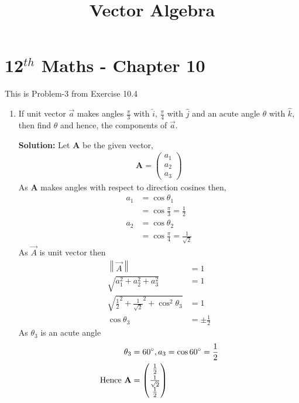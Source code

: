 \documentclass[12pt]{article}
\providecommand{\norm}[1]{\left\lVert#1\right\rVert}
\newcommand{\solution}{\noindent \textbf{Solution: }}
\newcommand{\myvec}[1]{\ensuremath{\begin{pmatrix}#1\end{pmatrix}}}
\let\vec\mathbf
\begin{document}
\begin{center}
\enlargethispage{-4cm}
\title{\textbf{Vector Algebra}}
\date{\vspace{-5ex}} %
\maketitle
\end{center}
\setcounter{page}{1}
\section*{12$^{th}$ Maths - Chapter 10}
This is Problem-3 from Exercise 10.4
\begin{enumerate}
\item If unit vector $\overrightarrow{a}$ makes angles $\frac{\pi}{3}$ with $\hat{i}$, $\frac{\pi}{4}$ with $\hat{j}$ and an acute angle $\theta$ with $\hat{k}$, then find $\theta$ and hence, the components of $\overrightarrow{a}$.

\solution
		Let $\vec{A}$ be the given vector, 
		\begin{align}
			\vec{A}=\myvec{a_1\\a_2\\a_3}
		\end{align}
As $\vec{A}$ makes angles with respect to direction cosines then,
		\begin{align}
			a_1&=\cos\theta_1\\ 
			&=\cos\frac{\pi}{3}=\frac{1}{2}\\
			a_2&=\cos\theta_2\\ 
			&=\cos\frac{\pi}{4}=\frac{1}{\sqrt{2}}
		\end{align}
As $\Vec{A}$ is unit vector then
\begin{align}
    \norm{\Vec{A}}&=1\\
    \sqrt{a_1^2+a_2^2+a_3^2}&=1\\
    \sqrt{\frac{1}{2}^2+\frac{1}{\sqrt{2}}^2+\cos^2\theta_3 }&=1\\
    \cos\theta_3 &=\pm\frac{1}{2}
\end{align}
As $\theta_3$ is an acute angle
\begin{align}
    \theta_3&=60\degree, a_3=\cos60\degree=\frac{1}{2}\\
    \text{Hence }\vec{A}&=\myvec{\frac{1}{2}\\[2pt] \frac{1}{\sqrt{2}}\\[2pt] \frac{1}{2}}
\end{align}
\end{enumerate}
\end{document}
